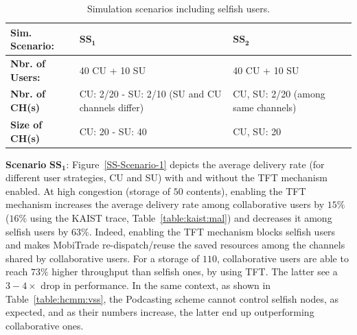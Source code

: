 \begin{table}[!h]
\vspace{-0.1in}
\caption{Simulation scenarios including selfish users.}
\centering
\label{table:m-sim-sce}
\footnotesize
\begin{tabular}{|p{3cm}|p{4cm}|p{4cm}|}
\hline
\bfseries Sim. Scenario: & $\mathbf{SS_1}$ & $\mathbf{SS_2}$\\
\hline
\bfseries Nbr. of Users: & 40 CU + 10 SU & 40 CU + 10 SU\\
\hline
\bfseries Nbr. of CH(s) & CU: 2/20 - SU: 2/10 (SU and CU channels differ) & CU, SU: 2/20 (among same channels) \\
\hline
\bfseries Size of CH(s) & CU: 20 - SU: 40  & CU, SU: 20 \\
\hline

\end{tabular}
\end{table}

\noindent \textbf{Scenario} $\mathbf{SS_1}$:  Figure~\ref{SS-Scenario-1} depicts the average delivery rate (for different user strategies, CU and SU) with and without the TFT mechanism enabled. At high congestion (storage of $50$ contents), enabling the TFT mechanism increases the average delivery rate among collaborative users by $15\%$ ($16\%$ using the KAIST trace, Table~\ref{table:kaist:mal}) and decreases it among selfish users by $63\%$. Indeed, enabling the TFT mechanism blocks selfish users and makes MobiTrade re-dispatch/reuse the saved resources among the channels shared by collaborative users. For a storage of $110$, collaborative users are able to reach  $73\%$ higher throughput than selfish ones, by using TFT. The latter see a $3-4\times$ drop in performance.  In the same context, as shown in Table~\ref{table:hcmm:vss}, the Podcasting scheme cannot control selfish nodes, as expected, and as their numbers increase, the latter end up outperforming collaborative ones. 

